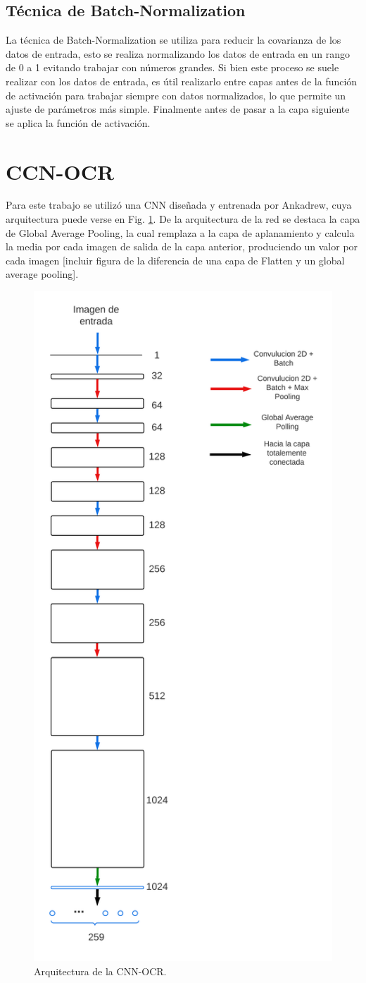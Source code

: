\subsection{Técnica de Batch-Normalization}

La técnica de Batch-Normalization se utiliza para reducir la covarianza de los datos de entrada, esto se realiza normalizando los datos de entrada en un rango de 0 a 1 evitando trabajar con números grandes. Si bien este proceso se suele realizar con los datos de entrada, es útil realizarlo entre capas antes de la función de activación para trabajar siempre con datos normalizados, lo que permite un ajuste de parámetros más simple. Finalmente antes de pasar a la capa siguiente se aplica la función de activación.

\section{CCN-OCR}

Para este trabajo se utilizó una CNN diseñada y entrenada por Ankadrew, cuya arquitectura puede verse en Fig. \ref{fig:arquitectura-cnn-ocr}. De la arquitectura de la red se destaca la capa de Global Average Pooling, la cual remplaza a la capa de aplanamiento y calcula la media por cada imagen de salida de la capa anterior, produciendo un valor por cada imagen [incluir figura de la diferencia de una capa de Flatten y un global average pooling].
\begin{figure}
    \centering
    \includegraphics[width=.4\textwidth]{imgs/cnn-ocr.png}
    \caption{Arquitectura de la CNN-OCR.}
    \label{fig:arquitectura-cnn-ocr}
\end{figure}

